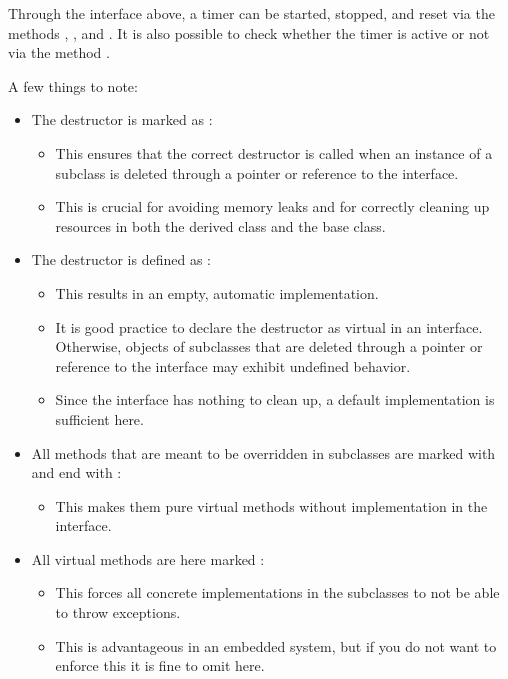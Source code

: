 \noindent Through the interface above, a timer can be started, stopped, and reset via the methods
, , and . It is also possible to check whether the timer
is active or not via the method .

A few things to note:
\begin{itemize}
  \item The destructor is marked as :
  \begin{itemize}
    \item This ensures that the correct destructor is called when an instance of a subclass is
      deleted through a pointer or reference to the interface.
    \item This is crucial for avoiding memory leaks and for correctly cleaning up resources in both
      the derived class and the base class.
  \end{itemize}
  \item The destructor is defined as :
  \begin{itemize}
    \item This results in an empty, automatic implementation.
    \item It is good practice to declare the destructor as virtual in an interface. Otherwise,
      objects of subclasses that are deleted through a pointer or reference to the interface may
      exhibit undefined behavior.
    \item Since the interface has nothing to clean up, a default implementation is sufficient here.
  \end{itemize}
  \item All methods that are meant to be overridden in subclasses are marked with 
    and end with :
  \begin{itemize}
    \item This makes them pure virtual methods without implementation in the interface.
  \end{itemize}
  \item All virtual methods are here marked :
  \begin{itemize}
    \item This forces all concrete implementations in the subclasses to not be able to throw
      exceptions.
    \item This is advantageous in an embedded system, but if you do not want to enforce this it is
      fine to omit  here.
  \end{itemize}

\end{itemize}
